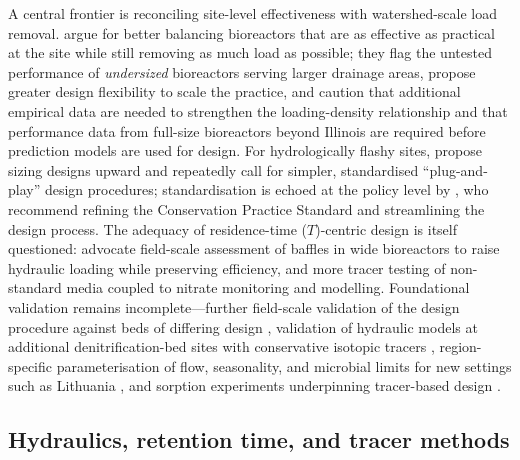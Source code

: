 A central frontier is reconciling site-level effectiveness with watershed-scale
load removal. \textcite{Christianson2026} argue for better balancing bioreactors
that are as effective as practical at the site while still removing as much load
as possible; they flag the untested performance of \emph{undersized} bioreactors
serving larger drainage areas, propose greater design flexibility to scale the
practice, and caution that additional empirical data are needed to strengthen the
loading-density relationship and that performance data from full-size bioreactors
beyond Illinois are required before prediction models are used for design. For
hydrologically flashy sites, \textcite{Dougherty2020b} propose sizing designs
upward and repeatedly call for simpler, standardised ``plug-and-play'' design
procedures; standardisation is echoed at the policy level by
\textcite{Christianson2021}, who recommend refining the Conservation Practice
Standard and streamlining the design process. The adequacy of residence-time
($T$)-centric design is itself questioned: \textcite{deOliveira2023} advocate
field-scale assessment of baffles in wide bioreactors to raise hydraulic loading
while preserving efficiency, and more tracer testing of non-standard media
coupled to nitrate monitoring and modelling. Foundational validation remains
incomplete---further field-scale validation of the design procedure against beds
of differing design \parencite{Christianson2013}, validation of hydraulic models
at additional denitrification-bed sites with conservative isotopic tracers
\parencite{Ghane2015}, region-specific parameterisation of flow, seasonality, and
microbial limits for new settings such as Lithuania \parencite{Povilaitis2020},
and sorption experiments underpinning tracer-based design \parencite{Ghane2019}.

\subsection{Hydraulics, retention time, and tracer methods}

